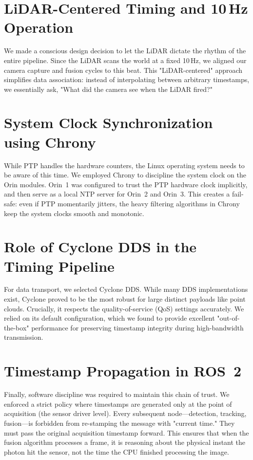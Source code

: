 \documentclass[12pt,a4paper]{report}
\begin{document}
{\section{LiDAR-Centered Timing and 10\,Hz Operation}
We made a conscious design decision to let the LiDAR dictate the rhythm of the entire pipeline. Since the LiDAR scans the world at a fixed 10\,Hz, we aligned our camera capture and fusion cycles to this beat. This "LiDAR-centered" approach simplifies data association: instead of interpolating between arbitrary timestamps, we essentially ask, "What did the camera see when the LiDAR fired?"

\section{System Clock Synchronization using Chrony}
While PTP handles the hardware counters, the Linux operating system needs to be aware of this time. We employed Chrony to discipline the system clock on the Orin modules. Orin~1 was configured to trust the PTP hardware clock implicitly, and then serve as a local NTP server for Orin~2 and Orin~3. This creates a fail-safe: even if PTP momentarily jitters, the heavy filtering algorithms in Chrony keep the system clocks smooth and monotonic.

\section{Role of Cyclone DDS in the Timing Pipeline}
For data transport, we selected Cyclone DDS. While many DDS implementations exist, Cyclone proved to be the most robust for large distinct payloads like point clouds. Crucially, it respects the quality-of-service (QoS) settings accurately. We relied on its default configuration, which we found to provide excellent "out-of-the-box" performance for preserving timestamp integrity during high-bandwidth transmission.

\section{Timestamp Propagation in ROS~2}
Finally, software discipline was required to maintain this chain of trust. We enforced a strict policy where timestamps are generated only at the point of acquisition (the sensor driver level). Every subsequent node---detection, tracking, fusion---is forbidden from re-stamping the message with "current time." They must pass the original acquisition timestamp forward. This ensures that when the fusion algorithm processes a frame, it is reasoning about the physical instant the photon hit the sensor, not the time the CPU finished processing the image.

}
\end{document}
